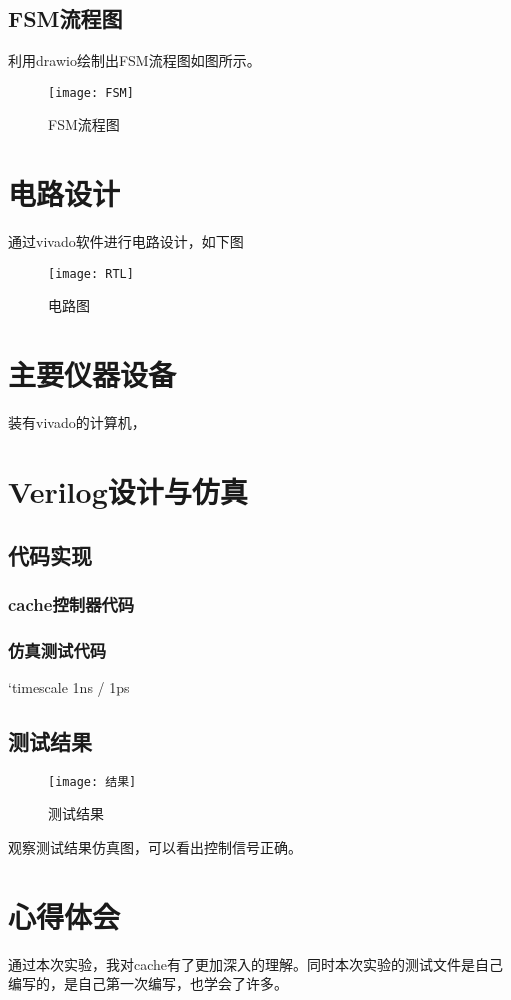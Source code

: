 \documentclass{../source/Experiment}
\begin{document}
        \subsection{FSM流程图}
            利用drawio绘制出FSM流程图如图所示。
            \begin{figure}[H]
                \centering
                \texttt{[image: FSM]}
                \caption{FSM流程图}
            \end{figure}
    \section{电路设计}
        通过vivado软件进行电路设计，如下图
        \begin{figure}[H]
            \centering
            \texttt{[image: RTL]}
            \caption{电路图}
        \end{figure}
    \section{主要仪器设备}
        装有vivado的计算机，
    \section{Verilog设计与仿真}
        \subsection{代码实现}
            \subsubsection{cache控制器代码}
            

            \subsubsection{仿真测试代码}
            `timescale 1ns / 1ps
            

        \subsection{测试结果}
            \begin{figure}[H]
                \centering
                \texttt{[image: 结果]}
                \caption{测试结果}
            \end{figure}
        观察测试结果仿真图，可以看出控制信号正确。

    \section{心得体会}
        通过本次实验，我对cache有了更加深入的理解。同时本次实验的测试文件是自己编写的，是自己第一次编写，也学会了许多。
\end{document}
